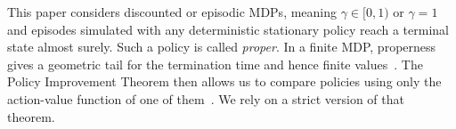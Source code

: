 


This paper considers discounted or episodic MDPs,
meaning $\gamma \in [0,1)$
or $\gamma=1$ and episodes simulated with any deterministic stationary policy reach a terminal state almost surely. Such a policy is called \emph{proper}. In a finite MDP, properness gives a geometric tail for the termination time and hence finite values~\citep[Section~2.2.1, Eqs.~(2.7)--(2.9)]{Bertsekas1996Neuro-DynamicProgramming}.
The Policy Improvement Theorem then allows us to compare policies using only the action-value function of one of them~\citep{Howard1960DynamicProcesses}.
We rely on a strict version of that theorem.


